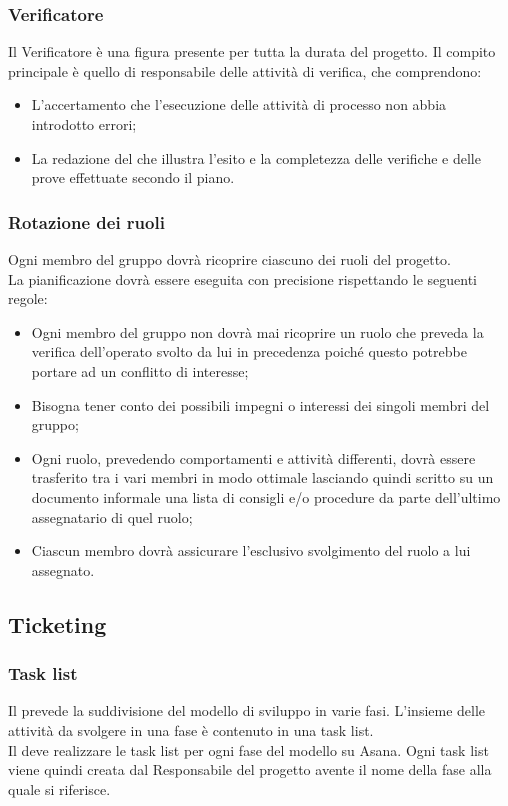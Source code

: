 \documentclass[NormeDiProgetto.tex]{subfiles}
\begin{document}
	\subsubsection{Verificatore}
	Il Verificatore è una figura presente per tutta la durata del progetto. Il compito principale è quello di responsabile delle attività di verifica, che comprendono:
	\begin{itemize}
	\item L'accertamento che l'esecuzione delle attività di processo non abbia introdotto errori;
	\item La redazione del \pdq{} che illustra l'esito e la completezza delle verifiche e delle prove effettuate secondo il piano.
	\end{itemize}
	
	\subsubsection{Rotazione dei ruoli}
	Ogni membro del gruppo dovrà ricoprire ciascuno dei ruoli del progetto.\\
	La pianificazione dovrà essere eseguita con precisione rispettando le seguenti regole:
	\begin{itemize}
		\item Ogni membro del gruppo non dovrà mai ricoprire un ruolo che preveda la verifica dell'operato svolto da lui in precedenza poiché questo potrebbe	portare ad un conflitto di interesse;
		\item Bisogna tener conto dei possibili impegni o interessi dei singoli membri del gruppo;
		\item Ogni ruolo, prevedendo comportamenti e attività differenti, dovrà essere trasferito tra i vari membri in modo ottimale lasciando quindi scritto su un documento informale una lista di consigli e/o procedure da parte dell'ultimo assegnatario di quel ruolo;
		\item Ciascun membro dovrà assicurare l’esclusivo svolgimento del ruolo a lui assegnato.
	\end{itemize}
	
	
	\subsection{Ticketing}
	\subsubsection{Task list}
	Il \pdp{} prevede la suddivisione del modello di sviluppo in varie fasi.
	L'insieme delle attività da svolgere in una fase è contenuto in una task list.\\
	Il \respdiprog{} deve realizzare le task list per ogni fase del modello su Asana.
	Ogni task list viene quindi creata dal Responsabile del progetto avente il nome della fase alla quale si riferisce.
	
\end{document}
